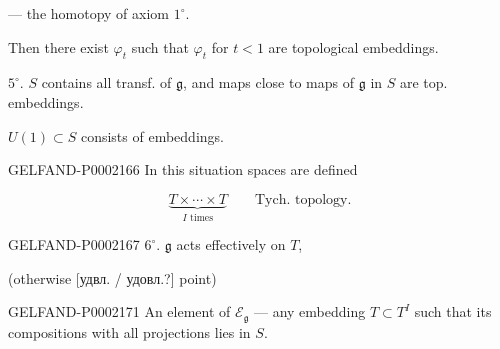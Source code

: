 --- the homotopy of axiom $1^{\circ}$.



Then there exist $\varphi_t$ such that $\varphi_t$ for $t<1$ are topological embeddings.



$5^{\circ}$. $S$ contains all transf. of $\mathfrak g$, and maps
close to maps of $\mathfrak g$ in $S$ are top. embeddings.



$U (1)\subset S$ consists of embeddings.



\begin{GelfandAdjacentEvidence}{GELFAND-P000216}{6}
In this situation spaces are defined






\end{GelfandAdjacentEvidence}





\begin{equation*}\underbrace{T\times\cdots\times T}_{I\text{ times}}\qquad\text{Tych. topology.}\end{equation*}



\begin{GelfandAdjacentEvidence}{GELFAND-P000216}{7}
$6^{\circ}$. $\mathfrak g$ acts effectively on $T$,



(otherwise [удвл. / удовл.?] point)
\end{GelfandAdjacentEvidence}



\begin{GelfandAdjacentEvidence}{GELFAND-P000217}{1}
An element of $\mathcal E_{\mathfrak g}$ --- any embedding $T\subset T^I$ such
that its compositions with all projections lies in $S$.
\end{GelfandAdjacentEvidence}

